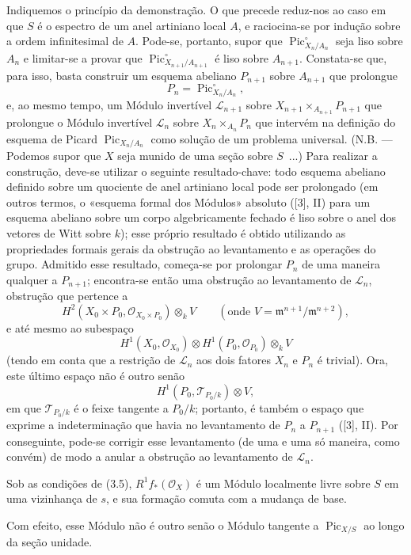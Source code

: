 Indiquemos o princípio da demonstração. O que precede reduz-nos ao caso em que
$S$ é o espectro de um anel artiniano local $A$, e raciocina-se por indução
sobre a ordem infinitesimal de $A$. Pode-se, portanto, supor que
$\operatorname{Pic}_{X_n/A_n}^\circ$ seja liso sobre $A_n$ e limitar-se a
provar que $\operatorname{Pic}_{X_{n+1}/A_{n+1}}^\circ$ é liso sobre
$A_{n+1}$. Constata-se que, para isso, basta construir um esquema abeliano
$P_{n+1}$ sobre $A_{n+1}$ que prolongue
\[
P_n=\operatorname{Pic}_{X_n/A_n}^\circ,
\]
e, ao mesmo tempo, um Módulo invertível $\mathcal L_{n+1}$ sobre
$X_{n+1}\times_{A_{n+1}}P_{n+1}$ que prolongue o Módulo invertível
$\mathcal L_n$ sobre $X_n\times_{A_n}P_n$ que intervém na definição do esquema
de Picard $\operatorname{Pic}_{X_n/A_n}$ como solução de um problema universal.
(N.B. --- Podemos supor que $X$ seja munido de uma seção sobre $S$~...) Para
realizar a construção, deve-se utilizar o seguinte resultado-chave: todo
esquema abeliano definido sobre um quociente de anel artiniano local pode ser
prolongado (em outros termos, o «esquema formal dos Módulos» absoluto ([3], II)
para um esquema abeliano sobre um corpo algebricamente fechado é liso sobre o
anel dos
vetores de Witt sobre $k$); esse próprio resultado é obtido utilizando as
propriedades formais gerais da obstrução ao levantamento e as operações do
grupo. Admitido esse resultado, começa-se por prolongar $P_n$ de uma maneira
qualquer a $P_{n+1}$; encontra-se então uma obstrução ao levantamento de
$\mathcal L_n$, obstrução que pertence a
\[
H^2(X_0\times P_0,\mathcal O_{X_0\times P_0})\otimes_k V
\qquad(\text{onde }V=\mathfrak m^{n+1}/\mathfrak m^{n+2}),
\]
e até mesmo ao subespaço
\[
H^1(X_0,\mathcal O_{X_0})\otimes
H^1(P_0,\mathcal O_{P_0})\otimes_k V
\]
(tendo em conta que a restrição de $\mathcal L_n$ aos dois fatores $X_n$ e
$P_n$ é trivial). Ora, este último espaço não é outro senão
\[
H^1(P_0,\mathcal T_{P_0/k})\otimes V,
\]
em que $\mathcal T_{P_0/k}$ é o feixe tangente a $P_0/k$; portanto, é também o
espaço que exprime a indeterminação que havia no levantamento de $P_n$ a
$P_{n+1}$ ([3], II). Por conseguinte, pode-se corrigir esse levantamento (de
uma e uma só maneira, como convém) de modo a anular a obstrução ao levantamento
de $\mathcal L_n$.

 Sob as condições de (3.5),
$R^1f_*(\mathcal O_X)$ é um Módulo localmente livre sobre $S$ em uma
vizinhança de $s$, e sua formação comuta com a mudança de base.

Com efeito, esse Módulo não é outro senão o Módulo tangente a
$\operatorname{Pic}_{X/S}$ ao longo da seção unidade.

